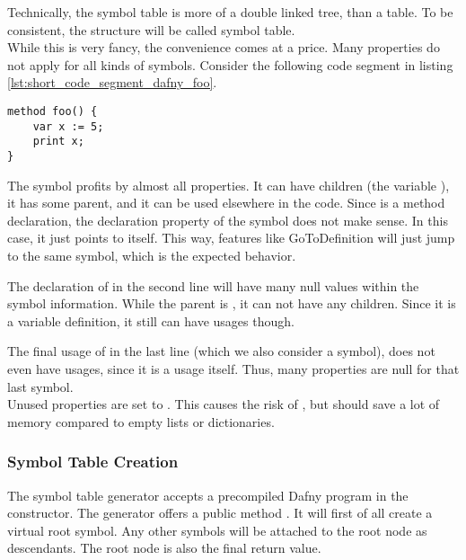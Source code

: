 Technically, the symbol table is more of a double linked tree, than a table.
To be consistent, the structure will be called symbol table.\\

While this is very fancy, the convenience comes at a price.
Many properties do not apply for all kinds of symbols.
Consider the following code segment in listing \ref{lst:short_code_segment_dafny_foo}.

\begin{lstlisting}[language=dafny, caption={Example Code Regarding Symbol Information}, captionpos=b, label={lst:short_code_segment_dafny_foo}]
method foo() {
    var x := 5;
    print x;
}
\end{lstlisting}

The symbol  profits by almost all properties.
It can have children (the variable ), it has some parent, and it can be used elsewhere in the code.
Since  is a method declaration, the declaration property of the symbol does not make sense.
In this case, it just points to itself.
This way, features like GoToDefinition will just jump to the same symbol, which is the expected behavior.

The declaration of  in the second line will have many null values within the symbol information.
While the parent is , it can not have any children.
Since it is a variable definition, it still can have usages though.

The final usage of  in the last line (which we also consider a symbol), does not even have usages, since it is a usage itself.
Thus, many properties are null for that last symbol.\\

Unused properties are set to .
This causes the risk of , but should save a lot of memory compared to empty lists or dictionaries.\\

\subsubsection{Symbol Table Creation}
The symbol table generator accepts a precompiled Dafny program in the constructor.
The generator offers a public method .
It will first of all create a virtual root symbol.
Any other symbols will be attached to the root node as descendants.
The root node is also the final return value.\\

